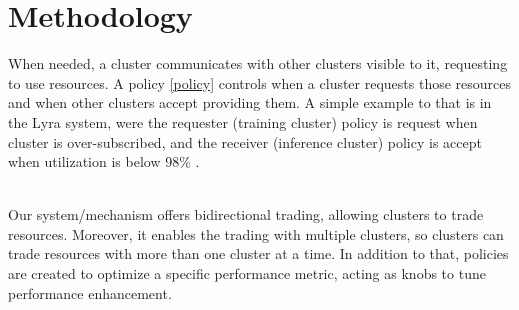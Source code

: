 \section{Methodology}



When needed, a cluster communicates with other clusters visible to it, requesting to use resources. A policy \ref{policy} 
controls when a cluster requests those resources and when other clusters accept providing them. 
A simple example to that is in the Lyra system, were the requester (training cluster) policy is request 
when cluster is over-subscribed, and the receiver (inference cluster) policy is accept when 
utilization is below 98\% \cite{li_lyra_2023}.

\\Our system/mechanism offers bidirectional trading, allowing clusters to trade resources. Moreover, it 
enables the trading with multiple clusters, so clusters can trade resources with more than one cluster at a time. 
In addition to that, policies are created to optimize a specific performance metric, acting as knobs to 
tune performance enhancement.


